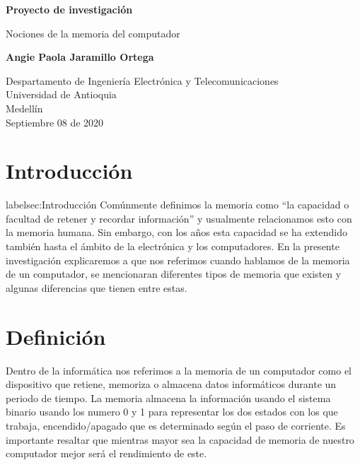 \documentclass{article}
\begin{document}
\begin{titlepage}
    \begin{center}
        \vspace*{1cm}
            
        \Huge
        \textbf{Proyecto de investigación}
            
        \vspace{0.5cm}
        \LARGE
        Nociones de la memoria del computador
            
        \vspace{1.5cm}
            
        \textbf{Angie Paola Jaramillo Ortega}
            
        \vfill
            
        \vspace{0.8cm}
            
        \Large
        Despartamento de Ingeniería Electrónica y Telecomunicaciones\\
        Universidad de Antioquia\\
        Medellín\\
        Septiembre 08 de 2020
            
    \end{center}
\end{titlepage}

\section*{Introducción}label{sec:Introducción}
Comúnmente definimos la memoria como “la capacidad o facultad de retener y recordar información”\cite{definicion} y usualmente relacionamos esto con la memoria humana. Sin embargo, con los años esta capacidad se ha extendido también hasta el ámbito de la electrónica y los computadores. En la presente investigación explicaremos a que nos referimos cuando hablamos de la memoria de un computador, se mencionaran diferentes tipos de memoria que existen y algunas diferencias que tienen entre estas.


\section*{Definición}
Dentro de la informática nos referimos a la memoria de un computador como el dispositivo que retiene, memoriza o almacena datos informáticos durante un periodo de tiempo. La memoria almacena la información usando el sistema binario usando los numero 0 y 1 para representar los dos estados con los que trabaja, encendido/apagado que es determinado según el paso de corriente. Es importante resaltar que mientras mayor sea la capacidad de memoria de nuestro computador mejor será el rendimiento de este.
\end{document}
